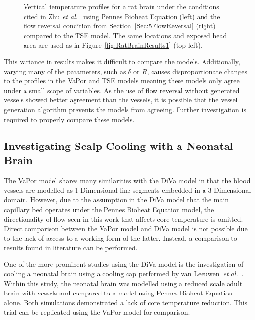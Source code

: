 \documentclass[11pt,english,a4paper,twoside,openright]{report}
\begin{document}
{{{{{{{\begin{figure}[h]
\begin{subfigure}[b]{0.49\textwidth}
	\end{subfigure}
	\caption[Vertical temperature profiles for the TSE model, Pennes Bioheat Equation, and the VaPor model with $C_{R}=5$]{Vertical temperature profiles for a rat brain under the conditions cited in Zhu \textit{et al.\ }\cite{zhu2006body} using Pennes Bioheat Equation (left) and the flow reversal condition from Section~\ref{Sec:5FlowReversal} (right) compared to the TSE model. The same locations and exposed head area are used as in Figure~\ref{fig:RatBrainResults1} (top-left).}
	\label{fig:RatBrainResults2}
\end{figure}

This variance in results makes it difficult to compare the models. Additionally, varying many of the parameters, such as $\delta$ or $R$, causes disproportionate changes to the profiles in the VaPor and TSE models meaning these models only agree under a small scope of variables. As the use of flow reversal without generated vessels showed better agreement than the vessels, it is possible that the vessel generation algorithm prevents the models from agreeing. Further investigation is required to properly compare these models.

\subsection{Investigating Scalp Cooling with a Neonatal Brain}

The VaPor model shares many similarities with the DiVa model \cite{kotte1996description} in that the blood vessels are modelled as 1-Dimensional line segments embedded in a 3-Dimensional domain. However, due to the assumption in the DiVa model that the main capillary bed operates under the Pennes Bioheat Equation model, the directionality of flow seen in this work that affects core temperature is omitted. Direct comparison between the VaPor model and DiVa model is not possible due to the lack of access to a working form of the latter. Instead, a comparison to results found in literature can be performed.

One of the more prominent studies using the DiVa model is the investigation of cooling a neonatal brain using a cooling cap performed by van Leeuwen~\textit{et al.\ }\cite{van2000numerical}. Within this study, the neonatal brain was modelled using a reduced scale adult brain with vessels and compared to a model using Pennes Bioheat Equation alone. Both simulations demonstrated a lack of core temperature reduction. This trial can be replicated using the VaPor model for comparison. 

}}}}}}}
\end{document}
